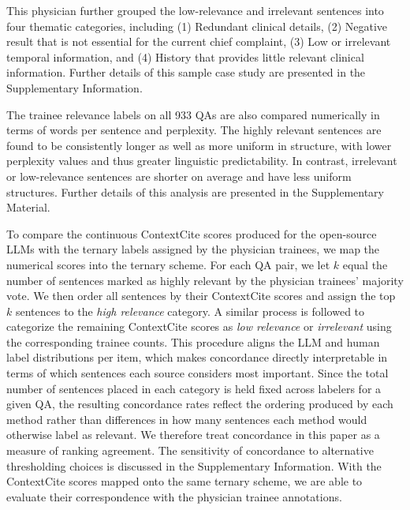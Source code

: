 \documentclass[fleqn,10pt]{wlscirep}
\begin{document}
This physician further grouped the low-relevance and irrelevant sentences into four thematic categories, including (1) Redundant clinical details, (2) Negative result that is not essential for the current chief complaint, (3) Low or irrelevant temporal information, and (4) History that provides little relevant clinical information. Further details of this sample case study are presented in the Supplementary Information.

The trainee relevance labels on all 933 QAs are also compared numerically in terms of words per sentence and perplexity. The highly relevant sentences are found to be consistently longer as well as more uniform in structure, with lower perplexity values and thus greater linguistic predictability. In contrast, irrelevant or low-relevance sentences are shorter on average and have less uniform structures. Further details of this analysis are presented in the Supplementary Material. %

To compare the continuous ContextCite scores produced for the open-source LLMs with the ternary labels assigned by the physician trainees, we map the numerical scores into the ternary scheme. For each QA pair, we let $k$ equal the number of sentences marked as highly relevant by the physician trainees' majority vote. We then order all sentences by their ContextCite scores and assign the top $k$ sentences to the \textit{high relevance} category. A similar process is followed to categorize the remaining ContextCite scores as \textit{low relevance} or \textit{irrelevant} using the corresponding trainee counts. This procedure aligns the LLM and human label distributions per item, which makes concordance directly interpretable in terms of which sentences each source considers most important. Since the total number of sentences placed in each category is held fixed across labelers for a given QA, the resulting concordance rates reflect the ordering produced by each method rather than differences in how many sentences each method would otherwise label as relevant. We therefore treat concordance in this paper as a measure of ranking agreement. The sensitivity of concordance to alternative thresholding choices is discussed in the Supplementary Information. With the ContextCite scores mapped onto the same ternary scheme, we are able to evaluate their correspondence with the physician trainee annotations.
\end{document}
